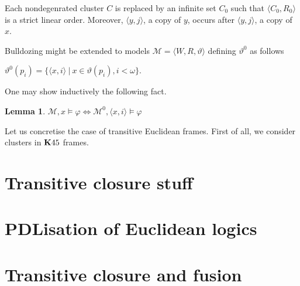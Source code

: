 \documentclass[a4paper]{article}
\theoremstyle{defin}
\theoremstyle{theorem}
\theoremstyle{prop}
\theoremstyle{lemma}
\newtheorem{lemma}{Lemma}
\theoremstyle{ex}
\theoremstyle{col}
\begin{document}
Each nondegenrated cluster $C$ is replaced by an infinite set $C_0$ such that $\langle C_0, R_0 \rangle$ is a strict linear order. Moreover, $\langle y, j \rangle$, a copy of $y$, occurs after $\langle y, j \rangle$, a copy of $x$.

Bulldozing might be extended to models $\mathcal{M} = \langle W, R, \vartheta \rangle$ defining $\vartheta^0$ as follows
\begin{center}
  $\vartheta^{0}(p_i) = \{ \langle x, i \rangle \: | \: x \in \vartheta(p_i), i < \omega \}$.
\end{center}

One may show inductively the following fact.
\begin{lemma}
  $\mathcal{M}, x \models \varphi \Leftrightarrow \mathcal{M}^{0}, \langle x, i \rangle \models \varphi$
\end{lemma}

Let us concretise the case of transitive Euclidean frames. First of all, we consider clusters in ${\bf K}45$ frames.

\subsection{}

\section{Transitive closure stuff}

\section{PDLisation of Euclidean logics}

\section{Transitive closure and fusion}



\end{document}
